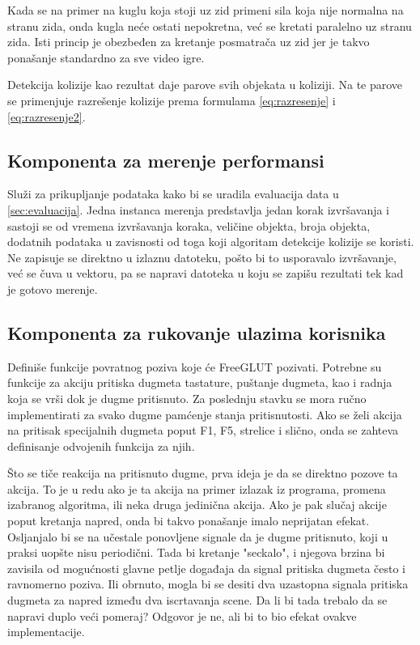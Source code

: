 \documentclass[12pt,oneside]{memoir}
\begin{document}
Kada se na primer na kuglu koja stoji uz zid primeni sila koja nije normalna na stranu zida, onda kugla neće ostati nepokretna,
već se kretati paralelno uz stranu zida. Isti princip je obezbeđen za kretanje posmatrača uz zid jer je 
takvo ponašanje standardno za sve video igre.

Detekcija kolizije kao rezultat daje parove svih objekata u koliziji. Na te parove se primenjuje 
razrešenje kolizije prema formulama \ref{eq:razresenje} i \ref{eq:razresenje2}.

\subsection{Komponenta za merenje performansi}
\label{sec:perf}

Služi za prikupljanje podataka kako bi se uradila evaluacija data u \ref{sec:evaluacija}.
Jedna instanca merenja predstavlja jedan korak izvršavanja i sastoji se od 
vremena izvršavanja koraka, veličine objekta, broja objekta, dodatnih podataka u zavisnosti od toga 
koji algoritam detekcije kolizije se koristi. Ne zapisuje se direktno u izlaznu datoteku, pošto bi 
to usporavalo izvršavanje, već se čuva u vektoru, pa se napravi datoteka u koju se zapišu rezultati 
tek kad je gotovo merenje.

\subsection{Komponenta za rukovanje ulazima korisnika}

Definiše funkcije povratnog poziva koje će FreeGLUT pozivati.
Potrebne su funkcije za akciju pritiska dugmeta tastature, puštanje dugmeta, kao i 
radnja koja se vrši dok je dugme pritisnuto. Za poslednju stavku se mora ručno implementirati 
za svako dugme pamćenje stanja pritisnutosti. Ako se želi akcija na pritisak specijalnih dugmeta  
poput F1, F5, strelice i slično, onda se zahteva definisanje odvojenih funkcija za njih.

Što se tiče reakcija na pritisnuto dugme, prva ideja je da se direktno pozove ta akcija. 
To je u redu ako je ta akcija na primer izlazak iz programa, promena izabranog algoritma, ili neka druga jedinična akcija.
Ako je pak slučaj akcije poput kretanja napred, onda bi takvo ponašanje imalo neprijatan efekat. 
Osljanjalo bi se na učestale ponovljene signale da je dugme pritisnuto, koji u praksi uopšte nisu periodični.
Tada bi kretanje "seckalo", i njegova brzina bi zavisila od mogućnosti glavne petlje događaja da signal pritiska dugmeta često i ravnomerno poziva.
Ili obrnuto, mogla bi se desiti dva uzastopna signala pritiska dugmeta za napred između dva iscrtavanja scene. 
Da li bi tada trebalo da se napravi duplo veći pomeraj? Odgovor je ne, ali bi to bio efekat ovakve implementacije.
\end{document}
